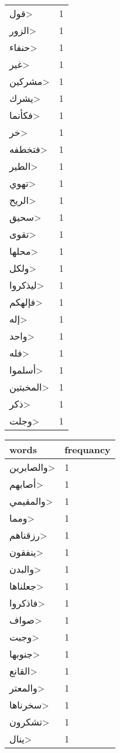 \documentclass{article}
\begin{document}
\begin{multicols}{3}
\begin{center}
\begin{tabular}{ P{2cm}  P{1cm}}
\<قول> & 1 \\ 
\<الزور> & 1 \\ 
\<حنفاء> & 1 \\ 
\<غير> & 1 \\ 
\<مشركين> & 1 \\ 
\<يشرك> & 1 \\ 
\<فكأنما> & 1 \\ 
\<خر> & 1 \\ 
\<فتخطفه> & 1 \\ 
\<الطير> & 1 \\ 
\<تهوي> & 1 \\ 
\<الريح> & 1 \\ 
\<سحيق> & 1 \\ 
\<تقوى> & 1 \\ 
\<محلها> & 1 \\ 
\<ولكل> & 1 \\ 
\<ليذكروا> & 1 \\ 
\<فإلهكم> & 1 \\ 
\<إله> & 1 \\ 
\<واحد> & 1 \\ 
\<فله> & 1 \\ 
\<أسلموا> & 1 \\ 
\<المخبتين> & 1 \\ 
\<ذكر> & 1 \\ 
\<وجلت> & 1 \\ 
\end{tabular} 
\begin{tabular}{ P{2cm}  P{1cm}} 
\textbf{words}    & \textbf{frequancy}  \\
\hline
\<والصابرين> & 1 \\ 
\<أصابهم> & 1 \\ 
\<والمقيمي> & 1 \\ 
\<ومما> & 1 \\ 
\<رزقناهم> & 1 \\ 
\<ينفقون> & 1 \\ 
\<والبدن> & 1 \\ 
\<جعلناها> & 1 \\ 
\<فاذكروا> & 1 \\ 
\<صواف> & 1 \\ 
\<وجبت> & 1 \\ 
\<جنوبها> & 1 \\ 
\<القانع> & 1 \\ 
\<والمعتر> & 1 \\ 
\<سخرناها> & 1 \\ 
\<تشكرون> & 1 \\ 
\<ينال> & 1 \\ 

\end{tabular}
\end{center}
\end{multicols}
\end{document}
